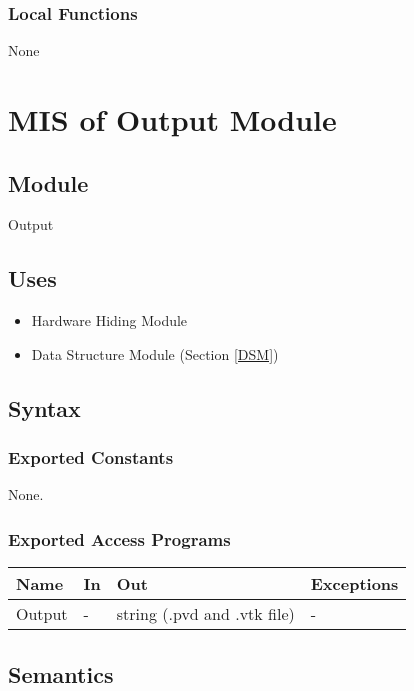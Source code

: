 \documentclass[12pt, titlepage]{article}
\begin{document}
	\subsubsection{Local Functions}
	
	None
	
	\newpage %
	\section{MIS of Output Module} \label{OM}
	
	\subsection{Module} Output
	
	\subsection{Uses} \begin{itemize} \item Hardware Hiding Module \item Data
		Structure Module (Section \ref{DSM})
		
	\end{itemize}
	
	\subsection{Syntax}
	
	\subsubsection{Exported Constants} None. \subsubsection{Exported Access
		Programs}
	
	\begin{center} \begin{tabular}{p{2cm} p{4cm} p{4cm} p{2cm}} \hline \textbf{Name}
			& \textbf{In} & \textbf{Out} & \textbf{Exceptions} \\ \hline Output& - & string (.pvd and .vtk file) & -
			 \\
			
			\hline \end{tabular} \end{center}
	
	\subsection{Semantics}
	
\end{document}

